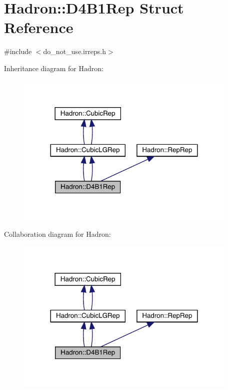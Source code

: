 \hypertarget{structHadron_1_1D4B1Rep}{}\section{Hadron\+:\+:D4\+B1\+Rep Struct Reference}
\label{structHadron_1_1D4B1Rep}


{\ttfamily \#include $<$do\+\_\+not\+\_\+use.\+irreps.\+h$>$}



Inheritance diagram for Hadron\+:\nopagebreak
\begin{figure}[H]
\begin{center}
\leavevmode
\includegraphics[width=300pt]{db/d76/structHadron_1_1D4B1Rep__inherit__graph}
\end{center}
\end{figure}


Collaboration diagram for Hadron\+:\nopagebreak
\begin{figure}[H]
\begin{center}
\leavevmode
\includegraphics[width=300pt]{dc/def/structHadron_1_1D4B1Rep__coll__graph}
\end{center}
\end{figure}
